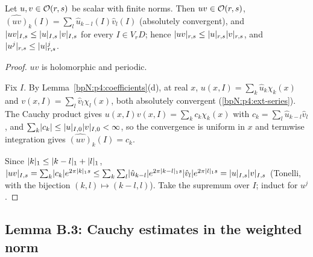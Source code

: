 \begin{lemma}[B.2]\label{bpN:p4:algebra}
Let $u,v\in\mathcal O(r,s)$ be scalar with finite norms. Then $uv\in\mathcal O(r,s)$, $\widehat{(uv)}_k(I)=\sum_l\hat u_{k-l}(I)\hat v_l(I)$ (absolutely convergent), and $\lvert uv\rvert_{I,s}\le\lvert u\rvert_{I,s}\,\lvert v\rvert_{I,s}$ for every $I\in V_rD$; hence
$\lvert uv\rvert_{r,s}\le\lvert u\rvert_{r,s}\lvert v\rvert_{r,s}$, and $\lvert u^j\rvert_{r,s}\le\lvert u\rvert_{r,s}^j$.
\end{lemma}
\begin{proof}
\label{stepN:p4:b2-class} $uv$ is holomorphic and periodic.

\label{stepN:p4:b2-coeff} Fix $I$. By Lemma~\ref{bpN:p4:coefficients}(d), at real $x$, $u(x,I)=\sum_k\hat u_k\chi_k(x)$ and $v(x,I)=\sum_l\hat v_l\chi_l(x)$, both absolutely convergent (\ref{bpN:p4:ext-series}). The Cauchy product gives
$u(x,I)v(x,I)=\sum_kc_k\chi_k(x)$ with $c_k=\sum_l\hat u_{k-l}\hat v_l$, and $\sum_k\lvert c_k\rvert\le\lvert u\rvert_{I,0}\lvert v\rvert_{I,0}<\infty$, so the convergence is uniform in $x$ and termwise integration gives $\widehat{(uv)}_k(I)=c_k$.

\label{stepN:p4:b2-norm} Since $\lvert k\rvert_1\le\lvert k-l\rvert_1+\lvert l\rvert_1$,
$\lvert uv\rvert_{I,s}=\sum_k\lvert c_k\rvert e^{2\pi\lvert k\rvert_1s}\le\sum_k\sum_l\lvert \hat u_{k-l}\rvert e^{2\pi\lvert k-l\rvert_1s}\lvert \hat v_l\rvert e^{2\pi\lvert l\rvert_1s}=\lvert u\rvert_{I,s}\lvert v\rvert_{I,s}$ (Tonelli, with the bijection $(k,l)\mapsto(k-l,l)$). Take the supremum over $I$; induct for $u^j$.
\end{proof}

\subsection{Lemma B.3: Cauchy estimates in the weighted norm}\label{bpN:p4:s-b3}

